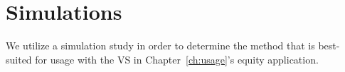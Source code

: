 \section{Simulations}
\label{sec:al:simulations}

We utilize a simulation study in order to determine the method that is 
best-suited for usage with the VS in Chapter~\ref{ch:usage}'s equity 
application.